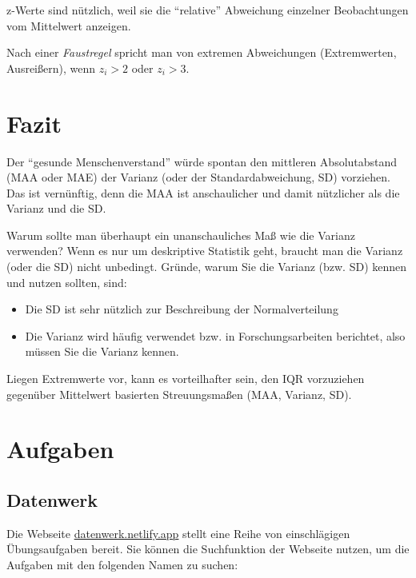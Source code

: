 \documentclass[
  a4paper,
]{scrbook}
\providecommand{\tightlist}{%
  \setlength{\itemsep}{0pt}\setlength{\parskip}{0pt}}\usepackage{longtable,booktabs,array}
\theoremstyle{definition}
\theoremstyle{definition}
\theoremstyle{definition}
\theoremstyle{remark}
\begin{document}
z-Werte sind nützlich, weil sie die ``relative'' Abweichung einzelner
Beobachtungen vom Mittelwert anzeigen.

Nach einer \emph{Faustregel} spricht man von extremen Abweichungen
(Extremwerten, Ausreißern), wenn \(z_i > 2\) oder \(z_i > 3\).

\section{Fazit}\label{fazit-3}

Der ``gesunde Menschenverstand'' würde spontan den mittleren
Absolutabstand (MAA oder MAE) der Varianz (oder der Standardabweichung,
SD) vorziehen. Das ist vernünftig, denn die MAA ist anschaulicher und
damit nützlicher als die Varianz und die SD.

Warum sollte man überhaupt ein unanschauliches Maß wie die Varianz
verwenden? Wenn es nur um deskriptive Statistik geht, braucht man die
Varianz (oder die SD) nicht unbedingt. Gründe, warum Sie die Varianz
(bzw. SD) kennen und nutzen sollten, sind:

\begin{itemize}
\tightlist
\item
  Die SD ist sehr nützlich zur Beschreibung der Normalverteilung
\item
  Die Varianz wird häufig verwendet bzw. in Forschungsarbeiten
  berichtet, also müssen Sie die Varianz kennen.
\end{itemize}

Liegen Extremwerte vor, kann es vorteilhafter sein, den IQR vorzuziehen
gegenüber Mittelwert basierten Streuungsmaßen (MAA, Varianz, SD).

\section{Aufgaben}\label{aufgaben-5}

\subsection{Datenwerk}\label{datenwerk}

Die Webseite \href{https://datenwerk.netlify.app}{datenwerk.netlify.app}
stellt eine Reihe von einschlägigen Übungsaufgaben bereit. Sie können
die Suchfunktion der Webseite nutzen, um die Aufgaben mit den folgenden
Namen zu suchen:
\end{document}
